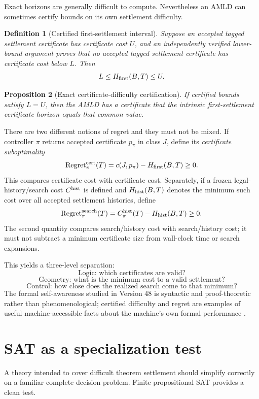 \documentclass[11pt]{article}
\newtheorem{definition}{Definition}[section]
\newtheorem{proposition}[definition]{Proposition}
\theoremstyle{remark}
\newcommand{\Reg}{\operatorname{Regret}}
\begin{document}
Exact horizons are generally difficult to compute. Nevertheless an AMLD can sometimes certify bounds on its own settlement difficulty.

\begin{definition}[Certified first-settlement interval]
Suppose an accepted tagged settlement certificate has certificate cost $U$, and an independently verified lower-bound argument proves that no accepted tagged settlement certificate has certificate cost below $L$. Then
\[
L\le H_{\rm first}(B,T)\le U.
\]
\end{definition}

\begin{proposition}[Exact certificate-difficulty certification]
If certified bounds satisfy $L=U$, then the AMLD has a certificate that the intrinsic first-settlement certificate horizon equals that common value.
\end{proposition}

There are two different notions of regret and they must not be mixed. If controller $\pi$ returns accepted certificate $p_\pi$ in class $J$, define its \emph{certificate suboptimality}
\[
\Reg^{\rm cert}_\pi(T)=c(J,p_\pi)-H_{\rm first}(B,T)\ge0.
\]
This compares certificate cost with certificate cost. Separately, if a frozen legal-history/search cost $C^{\rm hist}$ is defined and $H_{\rm hist}(B,T)$ denotes the minimum such cost over all accepted settlement histories, define
\[
\Reg^{\rm search}_\pi(T)=C^{\rm hist}_\pi(T)-H_{\rm hist}(B,T)\ge0.
\]
The second quantity compares search/history cost with search/history cost; it must not subtract a minimum certificate size from wall-clock time or search expansions.

This yields a three-level separation:
\[
\boxed{\text{Logic: which certificates are valid?}}
\]
\[
\boxed{\text{Geometry: what is the minimum cost to a valid settlement?}}
\]
\[
\boxed{\text{Control: how close does the realized search come to that minimum?}}
\]
The formal self-awareness studied in Version 48 is syntactic and proof-theoretic rather than phenomenological; certified difficulty and regret are examples of useful machine-accessible facts about the machine's own formal performance \cite{depths48,sicfiber}.

\section{SAT as a specialization test}

A theory intended to cover difficult theorem settlement should simplify correctly on a familiar complete decision problem. Finite propositional SAT provides a clean test.
\end{document}
